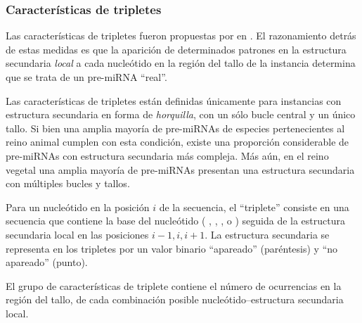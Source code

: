 \documentclass[12pt,bibliography=oldstyle,DIV=12,parskip=half-]{scrreprt}
\newcommand{\e}{\emph}
\newcommand{\ntA}{\textrm{\mono{A}}{ }}
\newcommand{\ntC}{\textrm{\mono{C}}{ }}
\newcommand{\ntG}{\textrm{\mono{G}}{ }}
\newcommand{\ntU}{\textrm{\mono{U}}{ }}
\newcommand{\pairL}{\textrm{\mono{(}}{ }}
\newcommand{\noPair}{\textrm{\mono{.}}{ }}
\begin{document}
\subsubsection{Características de tripletes}
%
Las características de tripletes fueron propuestas por
\citeauthor{xue} en \cite{xue}. El razonamiento detrás de estas
medidas es que la aparición de determinados patrones en la estructura
secundaria \e{local} a cada nucleótido en la región del tallo de la
instancia determina que se trata de un pre-miRNA ``real''.

Las características de tripletes están definidas únicamente para
instancias con estructura secundaria en forma de \e{horquilla}, con un
sólo bucle central y un único tallo.  Si bien una amplia mayoría de
pre-miRNAs de especies pertenecientes al reino animal cumplen con esta
condición, existe una proporción considerable de pre-miRNAs con
estructura secundaria más compleja. Más aún, en el reino vegetal una
amplia mayoría de pre-miRNAs presentan una estructura secundaria con
múltiples bucles y tallos.

Para un nucleótido en la posición $i$ de la secuencia, el ``triplete''
consiste en una secuencia que contiene la base del nucleótido (\ntA,
\ntC, \ntG, o \ntU) seguida de la estructura secundaria local en las
posiciones $i-1,i,i+1$. La estructura secundaria se representa en los
tripletes por un valor binario ``apareado'' \pairL (paréntesis) y ``no
apareado'' \noPair (punto).

El grupo de características de triplete contiene el número de
ocurrencias en la región del tallo, de cada combinación posible
nucleótido--estructura secundaria local.


\end{document}
